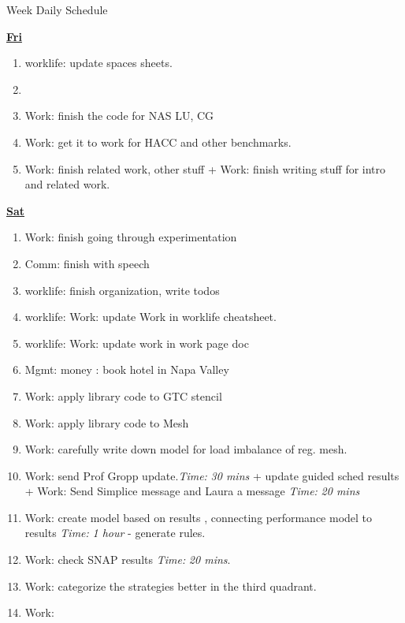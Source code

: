 \documentclass[serif, mathserif, final]{beamer}
\newcommand{\timeEst}[1]{\textit{Time:} \textit{#1}}
\begin{document}
\begin{frame}{}
\begin{columns}
\begin{column}{0.50\linewidth}
\begin{block}{Week Daily Schedule}

\textbf{\small {\underline{Fri}}} 
\begin{enumerate} 
\tiny \item \tiny worklife: update spaces sheets.

\item \tiny
\item \tiny Work: finish the code for NAS LU, CG
\item \tiny  Work: get it to work for HACC and other benchmarks. 
\item \tiny Work: finish related work, other stuff + Work: finish writing stuff for intro and related work. 
\end{enumerate}

\textbf{\small \underline{Sat}} 
\begin{enumerate} 

\item \tiny Work: finish going through experimentation 

\item \tiny Comm: finish with speech 

\item \tiny worklife: finish  organization, write todos 

\item \tiny worklife: Work: update Work in worklife cheatsheet. 

\item \tiny worklife: Work: update work in work page doc 

\item \tiny Mgmt: money : book hotel in Napa Valley 

\item \tiny Work: apply library code to GTC stencil 

\item \tiny Work: apply library code to Mesh 

\item \tiny Work: carefully write down model for load imbalance of reg. mesh. 


\item \tiny Work: send Prof Gropp update.\timeEst{30 mins}   + update guided sched results + 
Work: Send Simplice message and Laura a message \timeEst{20 mins} 
\item \tiny Work: create model based on results , connecting performance model to results \timeEst{1 hour} - generate rules. 
\item \tiny Work: check SNAP results \timeEst{20 mins}. 
\item \tiny Work: categorize the strategies better in the third quadrant. 
\item \tiny Work: 


\end{enumerate}
\end{block}
\end{column}
\end{columns}
\end{frame}
\end{document}
